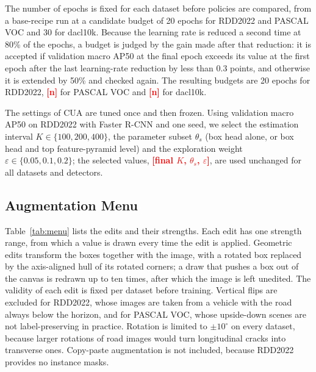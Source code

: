 \documentclass[conference]{IEEEtran}
\newcommand{\todo}[1]{\textcolor{red}{\textbf{[#1]}}}
\begin{document}
The number of epochs is fixed for each dataset before policies are compared, from a base-recipe run at a candidate budget of 20 epochs for RDD2022 and PASCAL VOC and 30 for dacl10k. Because the learning rate is reduced a second time at 80\% of the epochs, a budget is judged by the gain made after that reduction: it is accepted if validation macro AP50 at the final epoch exceeds its value at the first epoch after the last learning-rate reduction by less than 0.3 points, and otherwise it is extended by 50\% and checked again. The resulting budgets are 20 epochs for RDD2022, \todo{n} for PASCAL VOC and \todo{n} for dacl10k.

The settings of CUA are tuned once and then frozen. Using validation macro AP50 on RDD2022 with Faster R-CNN and one seed, we select the estimation interval $K\in\{100,200,400\}$, the parameter subset $\theta_s$ (box head alone, or box head and top feature-pyramid level) and the exploration weight $\varepsilon\in\{0.05,0.1,0.2\}$; the selected values, \todo{final $K$, $\theta_s$, $\varepsilon$}, are used unchanged for all datasets and detectors.

\subsection{Augmentation Menu}
\label{sec:setup_menu}

Table~\ref{tab:menu} lists the edits and their strengths. Each edit has one strength range, from which a value is drawn every time the edit is applied. Geometric edits transform the boxes together with the image, with a rotated box replaced by the axis-aligned hull of its rotated corners; a draw that pushes a box out of the canvas is redrawn up to ten times, after which the image is left unedited. The validity of each edit is fixed per dataset before training. Vertical flips are excluded for RDD2022, whose images are taken from a vehicle with the road always below the horizon, and for PASCAL VOC, whose upside-down scenes are not label-preserving in practice. Rotation is limited to $\pm10^\circ$ on every dataset, because larger rotations of road images would turn longitudinal cracks into transverse ones. Copy-paste augmentation is not included, because RDD2022 provides no instance masks.
\end{document}
